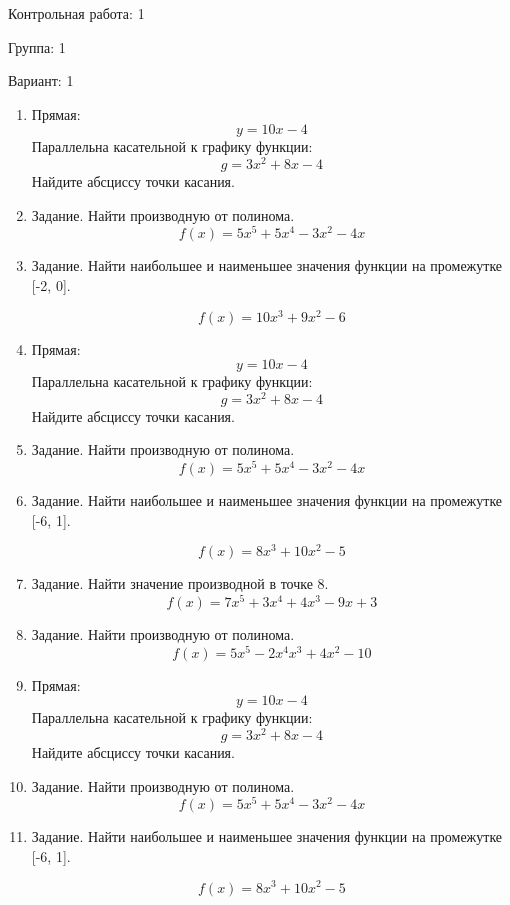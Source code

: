 \documentclass{article}
\begin{document}
Контрольная работа: 1

Группа: 1

Вариант: 1

\begin{enumerate}
\item Прямая: \[y = 10x - 4\] Параллельна касательной к графику функции: \[g = 3x^2 + 8x - 4\]
 Найдите абсциссу точки касания.

\item Задание. Найти производную от полинома.
\[ f(x) = 5x^5 + 5x^4 - 3x^2 - 4x \]

\item Задание. Найти наибольшее и наименьшее значения функции на промежутке [-2, 0]. 

\[ f(x) = 10x^3 + 9x^2 - 6 \]

\item Прямая: \[y = 10x - 4\] Параллельна касательной к графику функции: \[g = 3x^2 + 8x - 4\]
 Найдите абсциссу точки касания.

\item Задание. Найти производную от полинома.
\[ f(x) = 5x^5 + 5x^4 - 3x^2 - 4x \]

\item Задание. Найти наибольшее и наименьшее значения функции на промежутке [-6, 1]. 

\[ f(x) = 8x^3 + 10x^2 - 5 \]

\item Задание. Найти значение производной в точке 8.
\[ f(x) = 7x^5 + 3x^4 + 4x^3 - 9x + 3 \]

\item Задание. Найти производную от полинома.
\[ f(x) = 5x^5 - 2x^4x^3 + 4x^2 - 10 \]

\item Прямая: \[y = 10x - 4\] Параллельна касательной к графику функции: \[g = 3x^2 + 8x - 4\]
 Найдите абсциссу точки касания.

\item Задание. Найти производную от полинома.
\[ f(x) = 5x^5 + 5x^4 - 3x^2 - 4x \]

\item Задание. Найти наибольшее и наименьшее значения функции на промежутке [-6, 1]. 

\[ f(x) = 8x^3 + 10x^2 - 5 \]

\end{enumerate}
\end{document}
